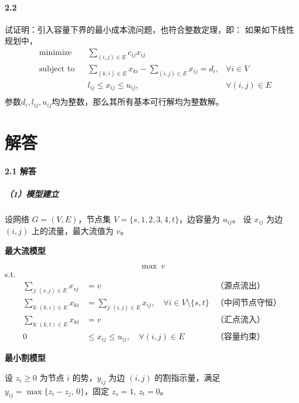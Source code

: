 \documentclass[12pt,a4paper]{article}
\begin{document}
\paragraph{2.2} 
试证明：引入容量下界的最小成本流问题，也符合整数定理，即：
如果如下线性规划中，
\begin{equation*}
\begin{aligned}
& {\text{minimize}}
& & \sum_{(i,j) \in E} c_{ij}x_{ij} \\
& \text{subject to}
& & \sum_{(k,i) \in E} x_{ki} - \sum_{(i,j)\in E} x_{ij} =d_i,&\forall i \in V\\
& & & l_{ij} \leq x_{ij} \leq u_{ij} ,&\forall (i,j) \in E\\
\end{aligned}
\end{equation*}
参数$d_i, l_{ij}, u_{ij}$均为整数，那么其所有基本可行解均为整数解。



\section*{解答}

\paragraph{2.1 解答}

\subparagraph{（1）模型建立}

设网络 $G=(V,E)$，节点集 $V=\{s,1,2,3,4,t\}$，边容量为 $u_{ij}$。
设 $x_{ij}$ 为边 $(i,j)$ 上的流量，最大流值为 $v$。

\textbf{最大流模型}

\[
\max\ v
\]
s.t.
\begin{align*}
\sum_{j:(s,j)\in E} x_{sj} &= v &\text{（源点流出）}\\
\sum_{k:(k,i)\in E} x_{ki} &= \sum_{j:(i,j)\in E} x_{ij}, \quad \forall i\in V\setminus\{s,t\} &\text{（中间节点守恒）}\\
\sum_{k:(k,t)\in E} x_{kt} &= v &\text{（汇点流入）}\\
0 &\le x_{ij} \le u_{ij}, \quad \forall (i,j)\in E &\text{（容量约束）}
\end{align*}

\textbf{最小割模型}

设 $z_i\ge 0$ 为节点 $i$ 的势，$y_{ij}$ 为边 $(i,j)$ 的割指示量，满足
$y_{ij}=\max\{z_i-z_j,\,0\}$，固定 $z_s=1,\,z_t=0$。
\end{document}
